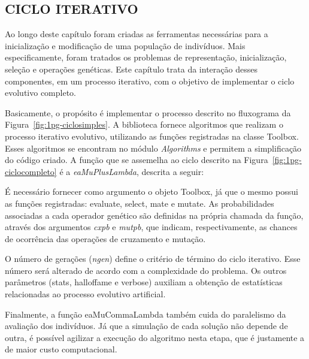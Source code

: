 \subsection{CICLO ITERATIVO}\label{ssec:3deap-cicloiter}

Ao longo deste capítulo foram criadas as ferramentas necessárias para a inicialização e modificação de uma população de indivíduos. Mais especificamente, foram tratados os problemas de representação, inicialização, seleção e operações genéticas. Este capítulo trata da interação desses componentes, em um processo iterativo, com o objetivo de implementar o ciclo evolutivo completo.

Basicamente, o propósito é implementar o processo descrito no fluxograma da Figura~\ref{fig:1pg-ciclosimples}. A biblioteca fornece algoritmos que realizam o processo iterativo evolutivo, utilizando as funções registradas na classe Toolbox. Esses algoritmos se encontram no módulo \textit{Algorithms} e permitem a simplificação do código criado. A função que se assemelha ao ciclo descrito na Figura~\ref{fig:1pg-ciclocompleto} é a \textit{eaMuPlusLambda}, descrita a seguir:


É necessário fornecer como argumento o objeto Toolbox, já que o mesmo possui as funções registradas: evaluate, select, mate e mutate. As probabilidades associadas a cada operador genético são definidas na própria chamada da função, através dos argumentos \textit{cxpb} e \textit{mutpb}, que indicam, respectivamente, as chances de ocorrência das operações de cruzamento e mutação.

O número de gerações (\textit{ngen}) define o critério de término do ciclo iterativo. Esse número será alterado de acordo com a complexidade do problema. Os outros parâmetros (stats, halloffame e verbose) auxiliam a obtenção de estatísticas relacionadas ao processo evolutivo artificial.

Finalmente, a função eaMuCommaLambda também cuida do paralelismo da avaliação dos indivíduos. Já que a simulação de cada solução não depende de outra, é possível agilizar a execução do algoritmo nesta etapa, que é justamente a de maior custo computacional.